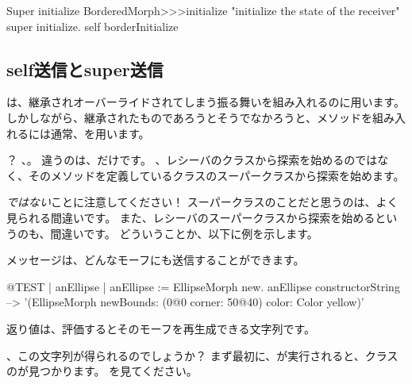 \documentclass[a4paper,10pt,twoside]{book}
\begin{document}
\begin{method}[morphinit]{Super initialize}
BorderedMorph>>>initialize
	"initialize the state of the receiver"
	super initialize.
	self borderInitialize
\end{method}


\subsection{self送信とsuper送信}

\super{}は、継承されオーバーライドされてしまう振る舞いを組み入れるのに用います。
しかしながら、継承されたものであろうとそうでなかろうと、メソッドを組み入れるには通常、\self{}を用います。

？ 
、。
違うのは、だけです。
、レシーバのクラスから探索を始めるのではなく、そのメソッドを定義しているクラスのスーパークラスから探索を始めます。

\emph{ではない}ことに注意してください！
スーパークラスのことだと思うのは、よく見られる間違いです。
また、レシーバのスーパークラスから探索を始めるというのも、間違いです。
どういうことか、以下に例を示します。

メッセージは、どんなモーフにも送信することができます。
\begin{code}{@TEST | anEllipse | anEllipse := EllipseMorph new.}
anEllipse constructorString --> '(EllipseMorph newBounds: (0@0 corner: 50@40) color: Color yellow)'
\end{code}
返り値は、評価するとそのモーフを再生成できる文字列です。

、この文字列が得られるのでしょうか？
まず最初に、が実行されると、クラスのが見つかります。
を見てください。
\end{document}
